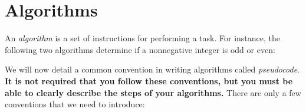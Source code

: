 \documentclass[12pt]{article}
\theoremstyle{plain}
\theoremstyle{definition}
\theoremstyle{remark}
\renewcommand{\Pr}{\textbf{Pr}}
\newcommand{\E}{\textbf{E}}
\begin{document}
\begin{enumerate}
\begin{comment}\begin{tcolorbox}
For $1\le i\le m$, let $X_i$ be the random variable that is $1$ if ball $i$ lands in the first bin and $0$ otherwise. Note that $\E[X_i]=\Pr[\text{ball }i\text{ lands in the first bin}]=\frac1n$. Then we seek $\E[X_1+\dots+X_m]=\E[X_1]+\dots+\E[X_m]=\frac1n+\dots+\frac1n=\frac{m}n$.

For $1\le i\le n$, let $Y_i$ be the random variable that is $1$ if bin $i$ is empty and $0$ otherwise. Note that $\E[Y_i]=\Pr[\text{bin }i\text{ is empty}]=\left(1-\frac1n\right)^m$ Then we seek $\E[Y_1+\dots+Y_n]=\E[Y_1]+\dots+\E[Y_n]=\left(1-\frac1n\right)^m+\dots+\left(1-\frac1n\right)^m=n\cdot\left(1-\frac1n\right)^m$.
\end{tcolorbox}\end{comment}
\end{enumerate}

\section{Algorithms}

An \emph{algorithm} is a set of instructions for performing a task. For instance, the following two algorithms determine if a nonnegative integer is odd or even:

\begin{center}
\begin{minipage}[t]{8cm}
\vspace{0pt}
\begin{algorithm}[H]
\DontPrintSemicolon
{}
\end{algorithm}
\end{minipage}
\begin{minipage}[t]{8cm}
\vspace{0pt}
\begin{algorithm}[H]
\DontPrintSemicolon
{}
\end{algorithm}
\end{minipage}
\end{center}

We will now detail a common convention in writing algorithms called \emph{pseudocode}. \noindent \textbf{It is not required that you follow these conventions, but you must be able to clearly describe the steps of your algorithms.} There are only a few conventions that we need to introduce:
\end{document}
